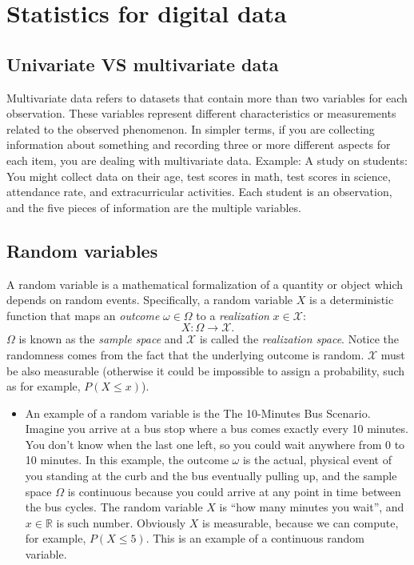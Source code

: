 \chapter{Statistics for digital data}

\section{Univariate VS multivariate data}

Multivariate data refers to datasets that contain more than two
variables for each observation. These variables represent different
characteristics or measurements related to the observed phenomenon. In
simpler terms, if you are collecting information about something and
recording three or more different aspects for each item, you are
dealing with multivariate data. Example: A study on students: You
might collect data on their age, test scores in math, test scores in
science, attendance rate, and extracurricular activities. Each student
is an observation, and the five pieces of information are the multiple
variables.


\section{Random variables}

A random variable is a mathematical formalization of a quantity or
object which depends on random events. Specifically, a random variable
$X$ is a deterministic function that maps an \emph{outcome}
$\omega\in\Omega$ to a \emph{realization} $x\in\mathcal{X}$:
\begin{equation}
  X:\Omega\rightarrow \mathcal{X}.
  \label{eq:DRV}
\end{equation}
$\Omega$ is known as the \emph{sample space} and $\mathcal{X}$ is
called the \emph{realization space}. Notice the randomness comes from
the fact that the underlying outcome is random. $\mathcal{X}$ must be
also measurable (otherwise it could be impossible to assign a
probability, such as for example, $P(X\leq x)$).

\begin{itemize}
\item An example of a random variable is the The 10-Minutes Bus
  Scenario. Imagine you arrive at a bus stop where a bus comes exactly
  every 10 minutes. You don't know when the last one left, so you
  could wait anywhere from 0 to 10 minutes. In this example, the
  outcome $\omega$ is the actual, physical event of you standing at
  the curb and the bus eventually pulling up, and the sample space
  $\Omega$ is continuous because you could arrive at any point in time
  between the bus cycles. The random variable $X$ is ``how many
  minutes you wait'', and $x\in\mathbb{R}$ is such number. Obviously
  $X$ is measurable, because we can compute, for example,
  $P(X\leq 5)$. This is an example of a continuous random variable.
\end{itemize}

